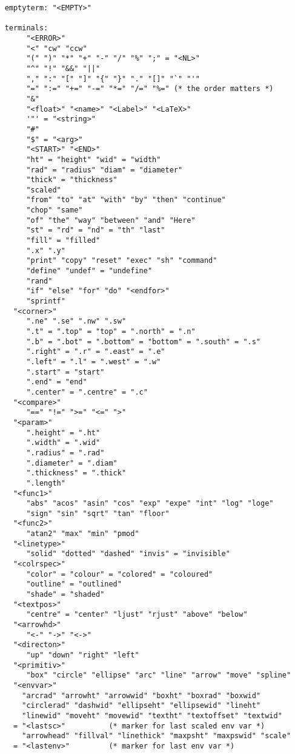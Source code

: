 \documentclass[11pt]{article}
\begin{document}
\begin{verbatim}
    emptyterm: "<EMPTY>"
    
    terminals:
         "<ERROR>"
         "<" "cw" "ccw"
         "(" ")" "*" "+" "-" "/" "%" ";" = "<NL>"
         "^" "!" "&&" "||" 
         "," ":" "[" "]" "{" "}" "." "[]" "`" "'"
         "=" ":=" "+=" "-=" "*=" "/=" "%=" (* the order matters *)
         "&"
         "<float>" "<name>" "<Label>" "<LaTeX>"
         '"' = "<string>"
         "#"
         "$" = "<arg>"
         "<START>" "<END>"
         "ht" = "height" "wid" = "width"
         "rad" = "radius" "diam" = "diameter"
         "thick" = "thickness"
         "scaled"
         "from" "to" "at" "with" "by" "then" "continue"
         "chop" "same"
         "of" "the" "way" "between" "and" "Here"
         "st" = "rd" = "nd" = "th" "last"
         "fill" = "filled"
         ".x" ".y"
         "print" "copy" "reset" "exec" "sh" "command"
         "define" "undef" = "undefine"
         "rand"
         "if" "else" "for" "do" "<endfor>"
         "sprintf"
      "<corner>"
         ".ne" ".se" ".nw" ".sw"
         ".t" = ".top" = "top" = ".north" = ".n"
         ".b" = ".bot" = ".bottom" = "bottom" = ".south" = ".s"
         ".right" = ".r" = ".east" = ".e"
         ".left" = ".l" = ".west" = ".w"
         ".start" = "start"
         ".end" = "end"
         ".center" = ".centre" = ".c"
      "<compare>"
         "==" "!=" ">=" "<=" ">"
      "<param>"
         ".height" = ".ht"
         ".width" = ".wid"
         ".radius" = ".rad"
         ".diameter" = ".diam"
         ".thickness" = ".thick"
         ".length"
      "<func1>"
         "abs" "acos" "asin" "cos" "exp" "expe" "int" "log" "loge"
         "sign" "sin" "sqrt" "tan" "floor"
      "<func2>"
         "atan2" "max" "min" "pmod"
      "<linetype>"
         "solid" "dotted" "dashed" "invis" = "invisible"
      "<colrspec>"
         "color" = "colour" = "colored" = "coloured"
         "outline" = "outlined"
         "shade" = "shaded"
      "<textpos>"
         "centre" = "center" "ljust" "rjust" "above" "below"
      "<arrowhd>"
         "<-" "->" "<->"
      "<directon>"
         "up" "down" "right" "left"
      "<primitiv>"
         "box" "circle" "ellipse" "arc" "line" "arrow" "move" "spline"
      "<envvar>"
        "arcrad" "arrowht" "arrowwid" "boxht" "boxrad" "boxwid"
        "circlerad" "dashwid" "ellipseht" "ellipsewid" "lineht"
        "linewid" "moveht" "movewid" "textht" "textoffset" "textwid"
      = "<lastsc>"          (* marker for last scaled env var *)
        "arrowhead" "fillval" "linethick" "maxpsht" "maxpswid" "scale" 
      = "<lastenv>"         (* marker for last env var *)
\end{verbatim}
\end{document}
